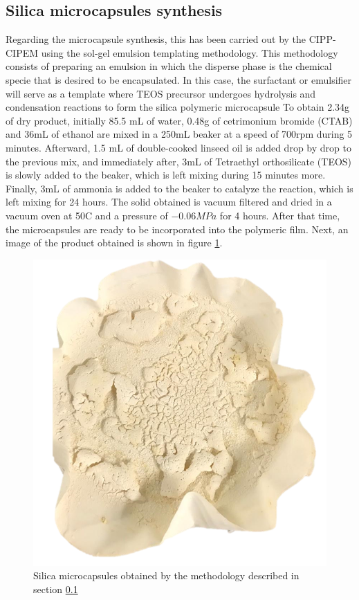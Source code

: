 \begin{refsection}
\subsection{Silica microcapsules synthesis}\label{sec:capusules}
Regarding the microcapsule synthesis, this has been carried out by the CIPP-CIPEM using the sol-gel emulsion templating methodology. This methodology consists of preparing an emulsion in which the disperse phase is the chemical specie that is desired to be encapsulated. In this case, the surfactant or emulsifier will serve as a template where TEOS precursor undergoes hydrolysis and condensation reactions to form the silica polymeric microcapsule \cites{GonzalezPungo2018EvaluacionActivos, GomezAlfonzo2018AceiteOxigeno} To obtain 2.34g of dry product, initially 85.5 mL of water, 0.48g of cetrimonium bromide (CTAB) and 36mL of ethanol are mixed in a 250mL beaker at a speed of 700rpm during 5 minutes. Afterward, 1.5 mL of double-cooked linseed oil is added drop by drop to the previous mix, and immediately after, 3mL of Tetraethyl orthosilicate (TEOS) is slowly added to the beaker, which is left mixing during 15 minutes more. Finally, 3mL of ammonia is added to the beaker to catalyze the reaction, which is left mixing for 24 hours. The solid obtained is vacuum filtered and dried in a vacuum oven at 50\degree C and a pressure of $-0.06 MPa$ for 4 hours. After that time, the microcapsules are ready to be incorporated into the polymeric film. Next, an image of the product obtained is shown in figure \ref{fig:capsules}. 

\begin{figure}[ht]
    \centering
    \includegraphics[width=0.3\linewidth]{Documento_Latex/Tesis_1/Imagenes/capsulas.png}
    \caption{Silica microcapsules obtained by the methodology described in section \ref{sec:capusules}}
    \label{fig:capsules}
\end{figure}


\end{refsection}
